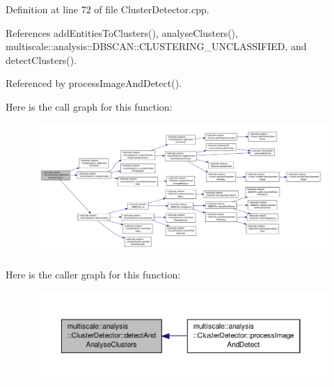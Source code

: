 Definition at line 72 of file Cluster\-Detector.\-cpp.



References add\-Entities\-To\-Clusters(), analyse\-Clusters(), multiscale\-::analysis\-::\-D\-B\-S\-C\-A\-N\-::\-C\-L\-U\-S\-T\-E\-R\-I\-N\-G\-\_\-\-U\-N\-C\-L\-A\-S\-S\-I\-F\-I\-E\-D, and detect\-Clusters().



Referenced by process\-Image\-And\-Detect().



Here is the call graph for this function\-:\nopagebreak
\begin{figure}[H]
\begin{center}
\leavevmode
\includegraphics[width=350pt]{classmultiscale_1_1analysis_1_1ClusterDetector_a46f98e066e74171774f0b6728118bc7b_cgraph}
\end{center}
\end{figure}




Here is the caller graph for this function\-:\nopagebreak
\begin{figure}[H]
\begin{center}
\leavevmode
\includegraphics[width=350pt]{classmultiscale_1_1analysis_1_1ClusterDetector_a46f98e066e74171774f0b6728118bc7b_icgraph}
\end{center}
\end{figure}


